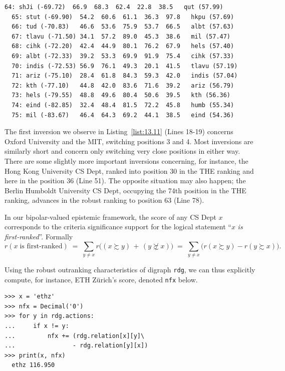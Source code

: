 \begin{lstlisting}[caption={Comparing the robust \NetFlows ranking with the THE ranking},label=list:13.11,basicstyle=\ttfamily\scriptsize]
  64: shJi (-69.72)  66.9  68.3  62.4  22.8  38.5   qut (57.99)
  65: stut (-69.90)  54.2  60.6  61.1  36.3  97.8   hkpu (57.69)
  66: tud (-70.83)   46.6  53.6  75.9  53.7  66.5   albt (57.63)
  67: tlavu (-71.50) 34.1  57.2  89.0  45.3  38.6   mil (57.47)
  68: cihk (-72.20)  42.4  44.9  80.1  76.2  67.9   hels (57.40)
  69: albt (-72.33)  39.2  53.3  69.9  91.9  75.4   cihk (57.33)
  70: indis (-72.53) 56.9  76.1  49.3  20.1  41.5   tlavu (57.19)
  71: ariz (-75.10)  28.4  61.8  84.3  59.3  42.0   indis (57.04)
  72: kth (-77.10)   44.8  42.0  83.6  71.6  39.2   ariz (56.79)
  73: hels (-79.55)  48.8  49.6  80.4  50.6  39.5   kth (56.36)
  74: eind (-82.85)  32.4  48.4  81.5  72.2  45.8   humb (55.34)
  75: mil (-83.67)   46.4  64.3  69.2  44.1  38.5   eind (54.36)
\end{lstlisting}

The first inversion we observe in Listing~\vref{list:13.11} (Lines 18-19) concerns Oxford University and the MIT, switching positions 3 and 4. Most inversions are similarly short and concern only switching very close positions in either way. There are some slightly more important inversions concerning, for instance, the Hong Kong University CS Dept, ranked into position 30 in the THE ranking and here in the position 36 (Line 51). The opposite situation may also happen; the Berlin Humboldt University CS Dept, occupying the 74th position in the THE ranking, advances in the robust \NetFlows ranking to position 63 (Line 78).

In our bipolar-valued epistemic framework, the \NetFlows score of any CS Dept $x$ corresponds to the criteria significance support for the logical statement ``$x$ \emph{is first-ranked}''. Formally 
\begin{equation}\label{eq:13.1}
  r(x \; \text{is first-ranked}) \; = \; \sum_{y \neq x} r\big((x \succsim y) \,+\, (y \not\succsim x)\big) \;=\; \sum_{y \neq x} \big(r(x \succsim y) - r(y \succsim x)\big).
\end{equation}

Using the robust outranking characteristics of digraph \texttt{rdg}, we can thus explicitly compute, for instance, ETH Zürich's \NetFlows score, denoted \texttt{nfx} below.
\begin{lstlisting}
>>> x = 'ethz'
>>> nfx = Decimal('0')
>>> for y in rdg.actions:
...     if x != y:
...         nfx += (rdg.relation[x][y]\
...                - rdg.relation[y][x])  
>>> print(x, nfx)
  ethz 116.950
\end{lstlisting}

